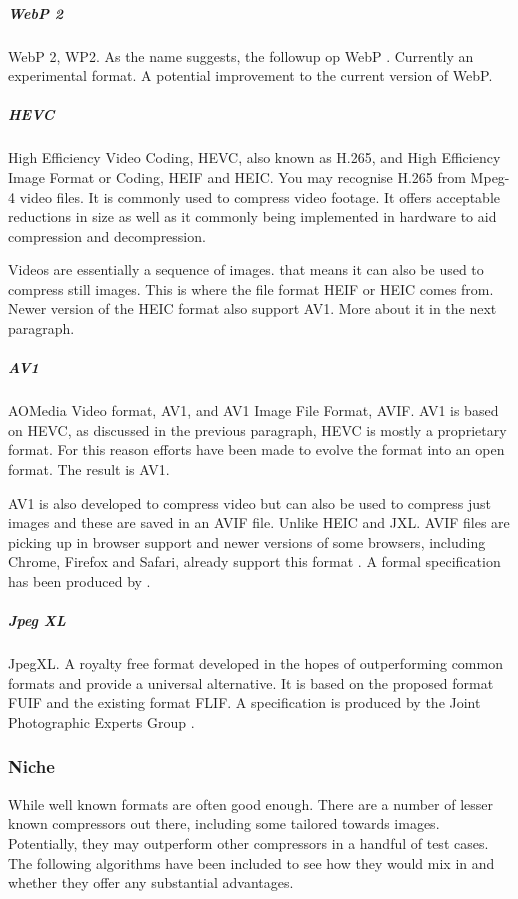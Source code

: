 \documentclass[11pt,a4paper]{report}
\begin{document}
\subparagraph{WebP 2}

WebP 2, WP2. As the name suggests, the followup op WebP \cite{webp2}. Currently an experimental format. A potential improvement to the current version of WebP.
        
\subparagraph{HEVC}

High Efficiency Video Coding, HEVC, also known as H.265, and High Efficiency Image Format or Coding, HEIF and HEIC. You may recognise H.265 from Mpeg-4 video files. It is commonly used to compress video footage. It offers acceptable reductions in size as well as it commonly being implemented in hardware to aid compression and decompression.
        
Videos are essentially a sequence of images. that means it can also be used to compress still images. This is where the file format HEIF or HEIC comes from. Newer version of the HEIC format also support AV1. More about it in the next paragraph.
        
\subparagraph{AV1}

AOMedia Video format, AV1, and AV1 Image File Format, AVIF. AV1 is based on HEVC, as discussed in the previous paragraph, HEVC is mostly a proprietary format. For this reason efforts have been made to evolve the format into an open format. The result is AV1.
        
AV1 is also developed to compress video but can also be used to compress just images and these are saved in an AVIF file. Unlike HEIC and JXL. AVIF files are picking up in browser support and newer versions of some browsers, including Chrome, Firefox and Safari, already support this format \cite{browsersupport}. A formal specification has been produced by \cite{av1spec}.

\subparagraph{Jpeg XL}

JpegXL. A royalty free format developed in the hopes of outperforming common formats and provide a universal alternative. It is based on the proposed format FUIF and the existing format FLIF. A specification is produced by the Joint Photographic Experts Group \cite{jxlspec}.

\subsubsection{Niche}

While well known formats are often good enough. There are a number of lesser known compressors out there, including some tailored towards images. Potentially, they may outperform other compressors in a handful of test cases. The following algorithms have been included to see how they would mix in and whether they offer any substantial advantages.
\end{document}
